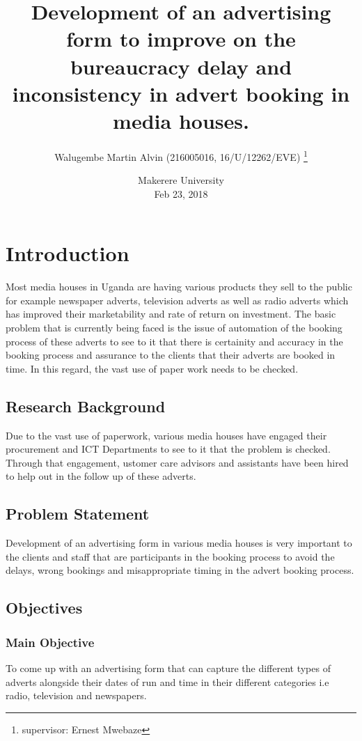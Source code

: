\documentclass[options]{article}
\title{Development of an advertising form to improve on the bureaucracy delay and inconsistency in advert booking in media houses.}
\author{Walugembe Martin Alvin (216005016, 16/U/12262/EVE) \thanks{supervisor: Ernest Mwebaze}}
\date{%
    Makerere University\\%
    Feb 23, 2018
}
\begin{document}
\begin{titlepage}
\maketitle
\end{titlepage}








\section{\textbf{ Introduction}} 
Most media houses in Uganda are having various products they sell to the public for example newspaper adverts, television adverts as well as radio adverts which has improved their marketability and rate of return on investment.
The basic problem that is currently being faced is the issue of automation of the booking process of these adverts to see to it that there is certainity and accuracy in the booking process and assurance to the clients that their adverts are booked in time. In this regard, the vast use of paper work needs to be checked.\bigbreak
 
\subsection{\textbf{Research Background}}
Due to the vast use of paperwork, various media houses have engaged their procurement and ICT Departments to see to it that the problem is checked.
Through that engagement, ustomer care advisors and assistants have been hired to help out in the follow up of these adverts.
 

 \bigbreak



\subsection{\textbf{Problem Statement}}
Development of an advertising form in various media houses is very important to the clients and staff that are participants in the booking process to avoid the delays, wrong bookings and misappropriate timing in the advert booking process.

\subsection{\textbf{Objectives}}


\subsubsection{\textbf{Main Objective}} 
 To come up with an advertising form that can capture the different types of adverts alongside their dates of run and time in their different categories i.e radio, television and newspapers.
\end{document}
